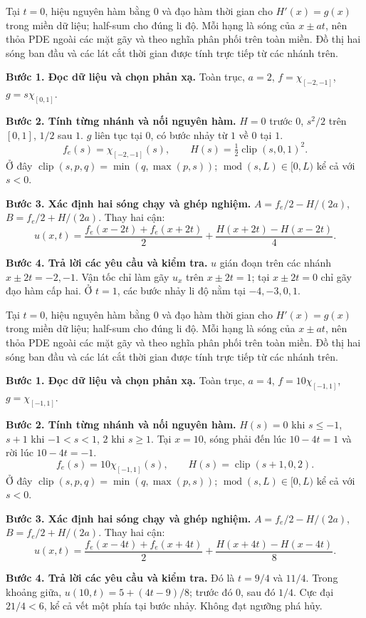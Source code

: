 Tại $t=0$, hiệu nguyên hàm bằng $0$ và đạo hàm thời gian cho $H'(x)=g(x)$ trong miền dữ liệu; half-sum cho đúng li độ. Mỗi hạng là sóng của $x\pm at$, nên thỏa PDE ngoài các mặt gãy và theo nghĩa phân phối trên toàn miền. Đồ thị hai sóng ban đầu và các lát cắt thời gian được tính trực tiếp từ các nhánh trên.

\textbf{Bước 1. Đọc dữ liệu và chọn phản xạ.} Toàn trục, $a=2$, $f=\chi_{[-2,-1]}$, $g=s\chi_{[0,1]}$.

\textbf{Bước 2. Tính từng nhánh và nối nguyên hàm.} $H=0$ trước $0$, $s^2/2$ trên $[0,1]$, $1/2$ sau $1$. $g$ liên tục tại $0$, có bước nhảy từ $1$ về $0$ tại $1$.
\[f_e(s)=\chi_{[-2,-1]}(s),\qquad H(s)=\tfrac12\operatorname{clip}(s,0,1)^2.\]
Ở đây $\operatorname{clip}(s,p,q)=\min(q,\max(p,s))$; $\operatorname{mod}(s,L)\in[0,L)$ kể cả với $s<0$.

\textbf{Bước 3. Xác định hai sóng chạy và ghép nghiệm.} $A=f_e/2-H/(2a)$, $B=f_e/2+H/(2a)$. Thay hai cận:
\[u(x,t)=\frac{f_e(x-2t)+f_e(x+2t)}2+\frac{H(x+2t)-H(x-2t)}{4}.\]

\textbf{Bước 4. Trả lời các yêu cầu và kiểm tra.} $u$ gián đoạn trên các nhánh $x\pm2t=-2,-1$. Vận tốc chỉ làm gãy $u_x$ trên $x\pm2t=1$; tại $x\pm2t=0$ chỉ gãy đạo hàm cấp hai. Ở $t=1$, các bước nhảy li độ nằm tại $-4,-3,0,1$.

Tại $t=0$, hiệu nguyên hàm bằng $0$ và đạo hàm thời gian cho $H'(x)=g(x)$ trong miền dữ liệu; half-sum cho đúng li độ. Mỗi hạng là sóng của $x\pm at$, nên thỏa PDE ngoài các mặt gãy và theo nghĩa phân phối trên toàn miền. Đồ thị hai sóng ban đầu và các lát cắt thời gian được tính trực tiếp từ các nhánh trên.

\textbf{Bước 1. Đọc dữ liệu và chọn phản xạ.} Toàn trục, $a=4$, $f=10\chi_{[-1,1]}$, $g=\chi_{[-1,1]}$.

\textbf{Bước 2. Tính từng nhánh và nối nguyên hàm.} $H(s)=0$ khi $s\le-1$, $s+1$ khi $-1<s<1$, $2$ khi $s\ge1$. Tại $x=10$, sóng phải đến lúc $10-4t=1$ và rời lúc $10-4t=-1$.
\[f_e(s)=10\chi_{[-1,1]}(s),\qquad H(s)=\operatorname{clip}(s+1,0,2).\]
Ở đây $\operatorname{clip}(s,p,q)=\min(q,\max(p,s))$; $\operatorname{mod}(s,L)\in[0,L)$ kể cả với $s<0$.

\textbf{Bước 3. Xác định hai sóng chạy và ghép nghiệm.} $A=f_e/2-H/(2a)$, $B=f_e/2+H/(2a)$. Thay hai cận:
\[u(x,t)=\frac{f_e(x-4t)+f_e(x+4t)}2+\frac{H(x+4t)-H(x-4t)}{8}.\]

\textbf{Bước 4. Trả lời các yêu cầu và kiểm tra.} Đó là $t=9/4$ và $11/4$. Trong khoảng giữa, $u(10,t)=5+(4t-9)/8$; trước đó $0$, sau đó $1/4$. Cực đại $21/4<6$, kể cả vết một phía tại bước nhảy. Không đạt ngưỡng phá hủy.

